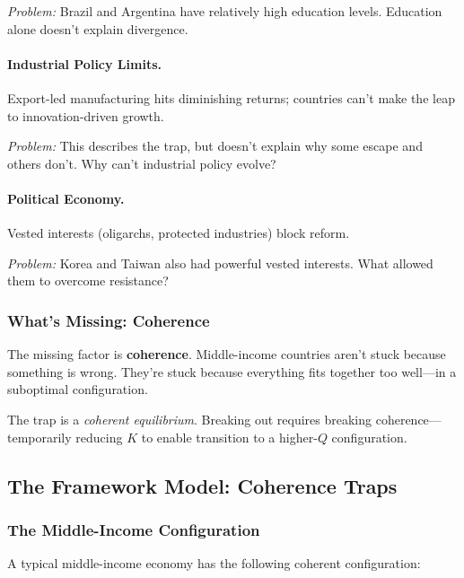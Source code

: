 \textit{Problem:} Brazil and Argentina have relatively high education levels. 
Education alone doesn't explain divergence.

\paragraph{Industrial Policy Limits.}
Export-led manufacturing hits diminishing returns; countries can't make the 
leap to innovation-driven growth.

\textit{Problem:} This describes the trap, but doesn't explain why some escape 
and others don't. Why can't industrial policy evolve?

\paragraph{Political Economy.}
Vested interests (oligarchs, protected industries) block reform.

\textit{Problem:} Korea and Taiwan also had powerful vested interests. What 
allowed them to overcome resistance?

\subsubsection{What's Missing: Coherence}

The missing factor is \textbf{coherence}. Middle-income countries aren't stuck 
because something is wrong. They're stuck because everything fits together 
too well---in a suboptimal configuration.

The trap is a \emph{coherent equilibrium}. Breaking out requires breaking 
coherence---temporarily reducing $K$ to enable transition to a higher-$Q$ 
configuration.

\subsection{The Framework Model: Coherence Traps}

\subsubsection{The Middle-Income Configuration}

A typical middle-income economy has the following coherent configuration:

